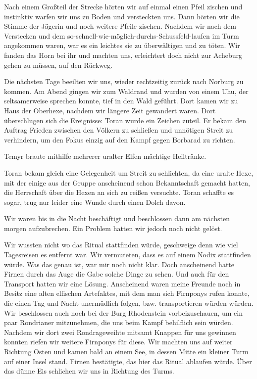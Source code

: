 Nach einem Großteil der Strecke hörten wir auf einmal einen Pfeil zischen und instinktiv warfen wir uns zu Boden und versteckten uns. Dann hörten wir die Stimme der Jägerin und noch weitere Pfeile zischen.
Nachdem wir nach dem Verstecken und dem so-schnell-wie-möglich-durchs-Schussfeld-laufen im Turm angekommen waren, war es ein leichtes sie zu überwältigen und zu töten. Wir fanden das Horn bei ihr und machten uns, erleichtert doch nicht zur Acheburg gehen zu müssen, auf den Rückweg.

Die nächsten Tage beeilten wir uns, wieder rechtzeitig zurück nach Norburg zu kommen. Am Abend gingen wir zum Waldrand und wurden von einem Uhu, der seltsamerweise sprechen konnte, tief in den Wald geführt. Dort kamen wir zu Haus der Oberhexe, nachdem wir längere Zeit gewandert waren. Dort überschlugen sich die Ereignisse:
Toran wurde ein Zeichen zuteil. Er bekam den Auftrag Frieden zwischen den Völkern zu schließen und unnötigen Streit zu verhindern, um den Fokus einzig auf den Kampf gegen Borbarad zu richten.

Temyr braute mithilfe mehrerer uralter Elfen mächtige Heiltränke.

Toran bekam gleich eine Gelegenheit um Streit zu schlichten, da eine uralte Hexe, mit der einige aus der Gruppe anscheinend schon Bekanntschaft gemacht hatten, die Herrschaft über die Hexen an sich zu reißen versuchte. Toran schaffte es sogar, trug nur leider eine Wunde durch einen Dolch davon.

Wir waren bis in die Nacht beschäftigt und beschlossen dann am nächsten morgen aufzubrechen. Ein Problem hatten wir jedoch noch nicht gelöst.

Wir wussten nicht wo das Ritual stattfinden würde, geschweige denn wie viel Tagesreisen es entfernt war. Wir vermuteten, dass es auf einem Nodix stattfinden würde. Was das genau ist, war mir noch nicht klar. Doch anscheinend hatte Firnen durch das Auge die Gabe solche Dinge zu sehen. Und auch für den Transport hatten wir eine Lösung. Anscheinend waren meine Freunde noch in Besitz eine alten elfischen Artefaktes, mit dem man sich Firnponys rufen konnte, die einen Tag und Nacht unermüdlich folgen, bzw. transportieren würden würden. Wir beschlossen auch noch bei der Burg Rhodenstein vorbeizuschauen, um ein paar Rondrianer mitzunehmen, die uns beim Kampf behilflich sein würden. Nachdem wir dort zwei Rondrageweihte mitsamt Knappen für uns gewinnen konnten riefen wir weitere Firnponys für diese. Wir machten uns auf weiter Richtung Osten und kamen bald an einem See, in dessen Mitte ein kleiner Turm auf einer Insel stand. Firnen bestätigte, das hier das Ritual ablaufen würde. Über das dünne Eis schlichen wir uns in Richtung des Turms. 


